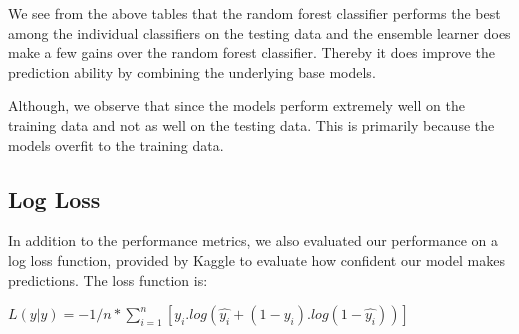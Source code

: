 \documentclass{article}
\begin{document}
\begin{multicols}{2}
	\begin{center}		
	\end{center}
	
	\begin{center}		
	\end{center}
	
	\begin{center}		
	\end{center}
	
	\begin{center}		
	\end{center}
	
	\begin{center}		
	\end{center}	
	
	\begin{center}		
	\end{center}	

	We see from the above tables that the random forest classifier performs the best among the individual classifiers on the testing data and the ensemble learner does make a few gains over the random forest classifier. Thereby it does improve the prediction ability by combining the underlying base models. 	
	\linebreak
	
	Although, we observe that since the models perform extremely well on the training data and not as well on the testing data. This is primarily because the models overfit to the training data. 
		
	\subsection{Log Loss}

	In addition to the performance metrics, we also evaluated our performance on a log loss function, provided by Kaggle to evaluate how confident our model makes predictions. The loss function is:
	
	    \begin{center}
	    $L(y|\hat{y}) = -1/n * \sum_{i=1}^{n}[y_i.log(\hat{y_i} + (1-y_i). log(1-\hat{y_i}))]$ 
	    \end{center}
	

\end{multicols}
\end{document}

